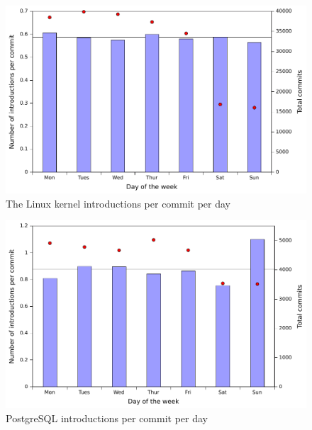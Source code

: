 \begin{figure}
\begin{center}
\includegraphics[width=\columnwidth]{linux-introductions-day.pdf}
\end{center}
\caption{The Linux kernel introductions per commit per day}
\label{fig-linux-introductions-day}
\end{figure}

\begin{figure}
\begin{center}
\includegraphics[width=\columnwidth]{postgresql-introductions-day.pdf}
\end{center}
\caption{PostgreSQL introductions per commit per day}
\label{fig-postgresql-introductions-day}
\end{figure}

